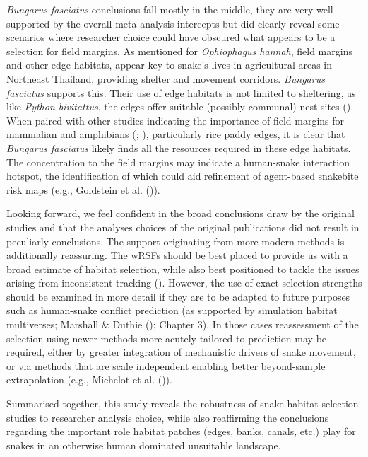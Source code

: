 \documentclass[10pt,a4paper]{article}
\begin{document}
\emph{Bungarus fasciatus} conclusions fall mostly in the middle, they are very well supported by the overall meta-analysis intercepts but did clearly reveal some scenarios where researcher choice could have obscured what appears to be a selection for field margins.
As mentioned for \emph{Ophiophagus hannah}, field margins and other edge habitats, appear key to snake's lives in agricultural areas in Northeast Thailand, providing shelter and movement corridors.
\emph{Bungarus fasciatus} supports this.
Their use of edge habitats is not limited to sheltering, as like \emph{Python bivitattus}, the edges offer suitable (possibly communal) nest sites ().
When paired with other studies indicating the importance of field margins for mammalian and amphibians (; ), particularly rice paddy edges, it is clear that \emph{Bungarus fasciatus} likely finds all the resources required in these edge habitats.
The concentration to the field margins may indicate a human-snake interaction hotspot, the identification of which could aid refinement of agent-based snakebite risk maps (e.g., Goldstein et al. ()).

Looking forward, we feel confident in the broad conclusions draw by the original studies and that the analyses choices of the original publications did not result in peculiarly conclusions.
The support originating from more modern methods is additionally reassuring.
The wRSFs should be best placed to provide us with a broad estimate of habitat selection, while also best positioned to tackle the issues arising from inconsistent tracking ().
However, the use of exact selection strengths should be examined in more detail if they are to be adapted to future purposes such as human-snake conflict prediction (as supported by simulation habitat multiverses; Marshall \& Duthie (); Chapter 3).
In those cases reassessment of the selection using newer methods more acutely tailored to prediction may be required, either by greater integration of mechanistic drivers of snake movement, or via methods that are scale independent enabling better beyond-sample extrapolation (e.g., Michelot et al. ()).

Summarised together, this study reveals the robustness of snake habitat selection studies to researcher analysis choice, while also reaffirming the conclusions regarding the important role habitat patches (edges, banks, canals, etc.) play for snakes in an otherwise human dominated unsuitable landscape.
\end{document}
